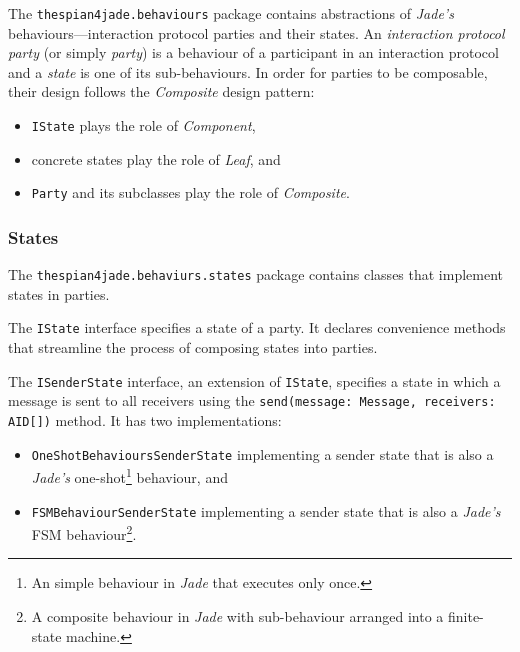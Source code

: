 The \texttt{thespian4jade.behaviours} package contains abstractions of \textit{Jade's} behaviours---interaction protocol parties and their states.
An \textit{interaction protocol party} (or simply \textit{party}) is a behaviour of a participant in an interaction protocol and a \textit{state} is one of its sub-behaviours.
In order for parties to be composable, their design follows the \textit{Composite} design pattern:
\begin{itemize}
	\item \texttt{IState} plays the role of \textit{Component},
	\item concrete states play the role of \textit{Leaf}, and
	\item \texttt{Party} and its subclasses play the role of \textit{Composite}.
\end{itemize}


\subsubsection{States}

The \texttt{thespian4jade.behaviurs.states} package contains classes that implement states in parties.

The \texttt{IState} interface specifies a state of a party.
It declares convenience methods that streamline the process of composing states into parties.

The \texttt{ISenderState} interface, an extension of \texttt{IState}, specifies a state in which a message is sent to all receivers using the \texttt{send(message: Message, receivers: AID[])} method.
It has two implementations:
\begin{itemize}
	\item \texttt{OneShotBehavioursSenderState} implementing a sender state that is also a \textit{Jade's} one-shot\footnote{An simple behaviour in \textit{Jade} that executes only once.} behaviour, and
	\item \texttt{FSMBehaviourSenderState} implementing a sender state that is also a \textit{Jade's} FSM behaviour\footnote{A composite behaviour in \textit{Jade} with sub-behaviour arranged into a finite-state machine.}.
\end{itemize}

